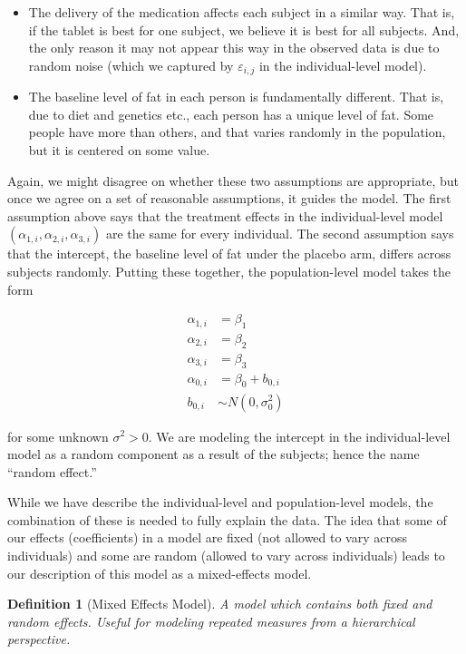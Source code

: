 \documentclass[
]{book}
\providecommand{\tightlist}{%
  \setlength{\itemsep}{0pt}\setlength{\parskip}{0pt}}
\theoremstyle{plain}
\theoremstyle{mydefn}
\newtheorem{definition}{Definition}[chapter]
\theoremstyle{myexmpl}
\theoremstyle{remark}
\begin{document}
\begin{itemize}
\tightlist
\item
  The delivery of the medication affects each subject in a similar way. That is, if the tablet is best for one subject, we believe it is best for all subjects. And, the only reason it may not appear this way in the observed data is due to random noise (which we captured by \(\varepsilon_{i,j}\) in the individual-level model).
\item
  The baseline level of fat in each person is fundamentally different. That is, due to diet and genetics etc., each person has a unique level of fat. Some people have more than others, and that varies randomly in the population, but it is centered on some value.
\end{itemize}

Again, we might disagree on whether these two assumptions are appropriate, but once we agree on a set of reasonable assumptions, it guides the model. The first assumption above says that the treatment effects in the individual-level model \(\left(\alpha_{1,i}, \alpha_{2,i}, \alpha_{3,i}\right)\) are the same for every individual. The second assumption says that the intercept, the baseline level of fat under the placebo arm, differs across subjects randomly. Putting these together, the population-level model takes the form

\[
\begin{aligned}
  \alpha_{1,i} &= \beta_1 \\
  \alpha_{2,i} &= \beta_2 \\
  \alpha_{3,i} &= \beta_3 \\
  \alpha_{0,i} &= \beta_0 + b_{0, i} \\
  b_{0,i} &\sim N\left(0, \sigma^2_0\right)
\end{aligned}
\]

for some unknown \(\sigma^2 > 0\). We are modeling the intercept in the individual-level model as a random component as a result of the subjects; hence the name ``random effect.''

While we have describe the individual-level and population-level models, the combination of these is needed to fully explain the data. The idea that some of our effects (coefficients) in a model are fixed (not allowed to vary across individuals) and some are random (allowed to vary across individuals) leads to our description of this model as a mixed-effects model.

\begin{definition}[Mixed Effects Model]
A model which contains both fixed and random effects. Useful for modeling repeated measures from a hierarchical perspective.
\end{definition}
\end{document}

